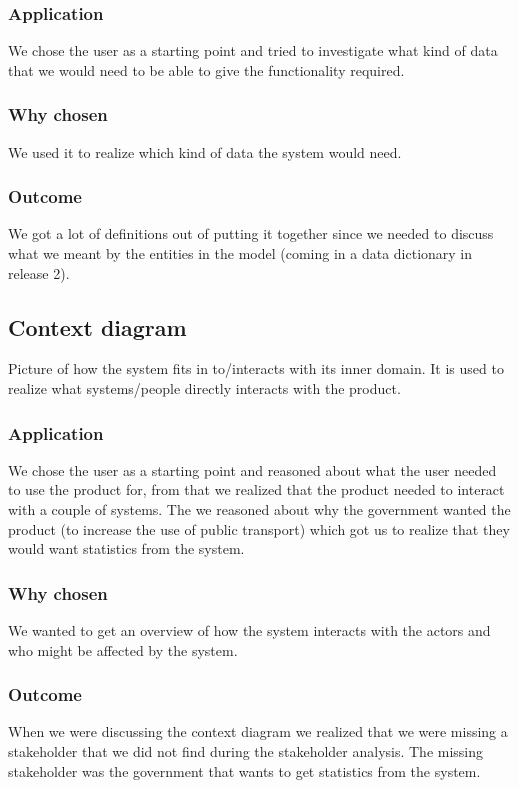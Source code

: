 \documentclass[a4paper]{article}
\begin{document}
    \subsubsection{Application}
    We chose the user as a starting point and tried to investigate what kind of data that we would need to be able to give the functionality required.
    \subsubsection{Why chosen}
    We used it to realize which kind of data the system would need.
    \subsubsection{Outcome}
	We got a lot of definitions out of putting it together since we needed to discuss what we meant by the entities in the model (coming in a data dictionary in release 2).

    \subsection{Context diagram} \label{subsec:context}
	Picture of how the system fits in to/interacts with its inner domain. It is used to realize what systems/people directly interacts with the product.
    \subsubsection{Application}
    We chose the user as a starting point and reasoned about what the user needed to use the product for, from that we realized that the product needed to interact with a couple of systems. The we reasoned about why the government wanted the product (to increase the use of public transport) which got us to realize that they would want statistics from the system.
    \subsubsection{Why chosen}
    We wanted to get an overview of how the system interacts with the actors and who might be affected by the system.
    \subsubsection{Outcome}
	When we were discussing the context diagram we realized that we were missing a stakeholder that we did not find during the stakeholder analysis. The missing stakeholder was the government that wants to get statistics from the system. 
\end{document}
